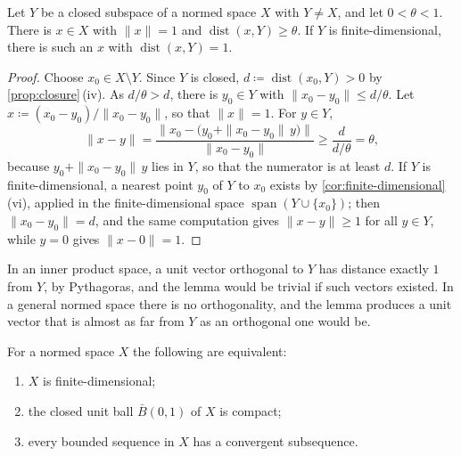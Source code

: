 \begin{lemma}
\label{lem:riesz}
Let $Y$ be a closed subspace of a normed space $X$ with $Y\ne X$, and let $0<\theta<1$. There is $x\in X$ with $\|x\|=1$ and $\operatorname{dist}(x,Y)\ge\theta$. If $Y$ is finite-dimensional, there is such an $x$ with $\operatorname{dist}(x,Y)=1$.
\end{lemma}

\begin{proof}
Choose $x_0\in X\setminus Y$. Since $Y$ is closed, $d\coloneqq\operatorname{dist}(x_0,Y)>0$ by \cref{prop:closure}\,(iv). As $d/\theta>d$, there is $y_0\in Y$ with $\|x_0-y_0\|\le d/\theta$. Let $x\coloneqq(x_0-y_0)/\|x_0-y_0\|$, so that $\|x\|=1$. For $y\in Y$,
\[
\|x-y\|=\frac{\bigl\|x_0-\bigl(y_0+\|x_0-y_0\|\,y\bigr)\bigr\|}{\|x_0-y_0\|}\ge\frac d{d/\theta}=\theta,
\]
because $y_0+\|x_0-y_0\|\,y$ lies in $Y$, so that the numerator is at least $d$. If $Y$ is finite-dimensional, a nearest point $y_0$ of $Y$ to $x_0$ exists by \cref{cor:finite-dimensional}\,(vi), applied in the finite-dimensional space $\operatorname{span}(Y\cup\{x_0\})$; then $\|x_0-y_0\|=d$, and the same computation gives $\|x-y\|\ge1$ for all $y\in Y$, while $y=0$ gives $\|x-0\|=1$.
\end{proof}

In an inner product space, a unit vector orthogonal to $Y$ has distance exactly $1$ from $Y$, by Pythagoras, and the lemma would be trivial if such vectors existed. In a general normed space there is no orthogonality, and the lemma produces a unit vector that is almost as far from $Y$ as an orthogonal one would be.

\begin{theorem}[Riesz]
\label{thm:riesz-compact}
For a normed space $X$ the following are equivalent:
\begin{enumerate}
\item $X$ is finite-dimensional;
\item the closed unit ball $\bar B(0,1)$ of $X$ is compact;
\item every bounded sequence in $X$ has a convergent subsequence.
\end{enumerate}
\end{theorem}

